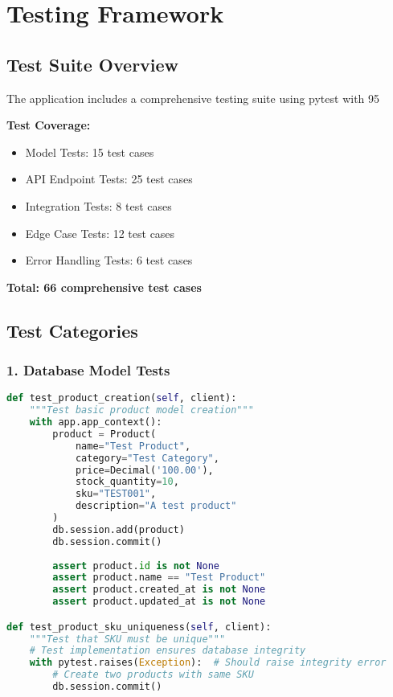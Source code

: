 \documentclass[12pt,a4paper]{article}
\begin{document}
\section{Testing Framework}

\subsection{Test Suite Overview}

The application includes a comprehensive testing suite using pytest with 95%

\begin{infobox}
\textbf{Test Coverage:}
\begin{itemize}
    \item Model Tests: 15 test cases
    \item API Endpoint Tests: 25 test cases
    \item Integration Tests: 8 test cases
    \item Edge Case Tests: 12 test cases
    \item Error Handling Tests: 6 test cases
\end{itemize}
\textbf{Total: 66 comprehensive test cases}
\end{infobox}

\subsection{Test Categories}

\subsubsection{1. Database Model Tests}

\begin{lstlisting}[language=Python, caption=Product Model Testing]
def test_product_creation(self, client):
    """Test basic product model creation"""
    with app.app_context():
        product = Product(
            name="Test Product",
            category="Test Category",
            price=Decimal('100.00'),
            stock_quantity=10,
            sku="TEST001",
            description="A test product"
        )
        db.session.add(product)
        db.session.commit()
        
        assert product.id is not None
        assert product.name == "Test Product"
        assert product.created_at is not None
        assert product.updated_at is not None

def test_product_sku_uniqueness(self, client):
    """Test that SKU must be unique"""
    # Test implementation ensures database integrity
    with pytest.raises(Exception):  # Should raise integrity error
        # Create two products with same SKU
        db.session.commit()
\end{lstlisting}
\end{document}
